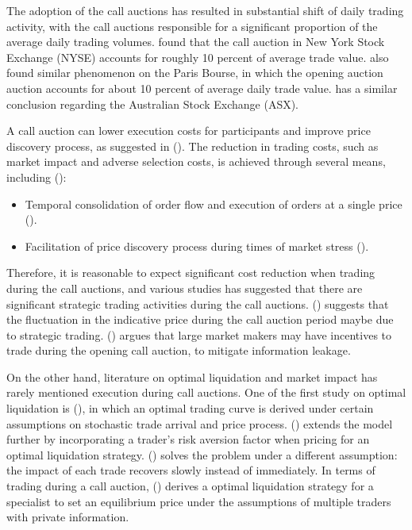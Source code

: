 \documentclass{article}
\begin{document}
The adoption of the call auctions has resulted in substantial shift of daily trading activity, with the call auctions responsible for a significant proportion of the average daily trading volumes. \cite{Madhavan2015} found that the call auction in New York Stock Exchange (NYSE) accounts for roughly 10 percent of average trade value. \cite{Bruno1999} also found similar phenomenon on the Paris Bourse, in which the opening auction auction accounts for about 10 percent of average daily trade value. \cite{Carole2006} has a similar conclusion regarding the Australian Stock Exchange (ASX).

A call auction can lower execution costs for participants and improve price discovery process, as suggested in (\cite{Pagano2003}). The reduction in trading costs, such as market impact and adverse selection costs, is achieved through several means, including (\cite{Carole2006}):
\begin{itemize}
  \item Temporal consolidation of order flow and execution of orders at a single price (\cite{Economides1995}).
  \item Facilitation of price discovery process during times of market stress (\cite{Madhavan1992}).
\end{itemize}

Therefore, it is reasonable to expect significant cost reduction when trading during the call auctions, and various studies has suggested that there are significant strategic trading activities during the call auctions. (\cite{Bruno1999}) suggests that the fluctuation in the indicative price during the call auction period maybe due to strategic trading. (\cite{Vives2001}) argues that large market makers may have incentives to trade during the opening call auction, to mitigate information leakage.

On the other hand, literature on optimal liquidation and market impact has rarely mentioned execution during call auctions. One of the first study on optimal liquidation is (\cite{HoStoll1981}), in which an optimal trading curve is derived under certain assumptions on stochastic trade arrival and price process. (\cite{AlmgrenChriss2000}) extends the model further by incorporating a trader's risk aversion factor when pricing for an optimal liquidation strategy. (\cite{Obizhaeva2013}) solves the problem under a different assumption: the impact of each trade recovers slowly instead of immediately. In terms of trading during a call auction, (\cite{Madhavan2015}) derives a optimal liquidation strategy for a specialist to set an equilibrium price under the assumptions of multiple traders with private information.
\end{document}
